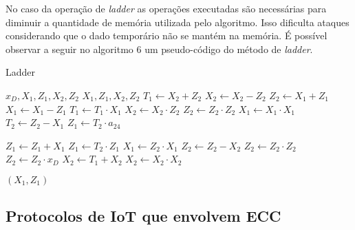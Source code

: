 No caso da operação de \textit{ladder} as operações executadas são necessárias para diminuir a quantidade de memória utilizada pelo algoritmo. Isso dificulta ataques considerando que o dado temporário não se mantém na memória. É possível observar a seguir no algoritmo 6 um pseudo-código do método de \textit{ladder}.

\begin{algorithm}[H]
\caption{Ladder}
\begin{multicols}{2}
\begin{algorithmic} 
    \REQUIRE $x_D, X_1, Z_1, X_2, Z_2$
    \ENSURE $X_1, Z_1, X_2, Z_2$
    \STATE $T_1 \leftarrow X_2 + Z_2$
    \STATE $X_2 \leftarrow X_2 - Z_2$
    \STATE $Z_2 \leftarrow X_1 + Z_1$
    \STATE $X_1 \leftarrow X_1 - Z_1$
    \STATE $T_1 \leftarrow T_1 \cdot X_1$
    \STATE $X_2 \leftarrow X_2 \cdot Z_2$
    \STATE $Z_2 \leftarrow Z_2 \cdot Z_2$
    \STATE $X_1 \leftarrow X_1 \cdot X_1$
    \STATE $T_2 \leftarrow Z_2 - X_1$
    \STATE $Z_1 \leftarrow T_2 \cdot a_24$
    
    
    \STATE $Z_1 \leftarrow Z_1 + X_1$
    \STATE $Z_1 \leftarrow T_2 \cdot Z_1$
    \STATE $X_1 \leftarrow Z_2 \cdot X_1$
    \STATE $Z_2 \leftarrow Z_2 - X_2$
    \STATE $Z_2 \leftarrow Z_2 \cdot Z_2$
    \STATE $Z_2 \leftarrow Z_2 \cdot x_D$
    \STATE $X_2 \leftarrow T_1 + X_2$
    \STATE $X_2 \leftarrow X_2 \cdot X_2$
    
    \RETURN $(X_1,Z_1)$
\end{algorithmic}
\end{multicols}
\end{algorithm}

\subsection{Protocolos de IoT que envolvem ECC}
